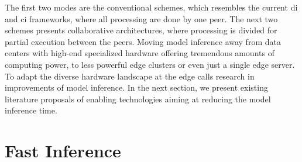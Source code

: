 The first two modes are the conventional schemes, which resembles the current \gls{di} and \gls{ci} frameworks, where all processing are done by one peer. The next two schemes presents collaborative architectures, where processing is divided for partial execution between the peers.
Moving model inference away from data centers with high-end specialized hardware offering tremendous amounts of computing power, to less powerful edge clusters or even just a single edge server. To adapt the diverse hardware landscape at the edge calls research in improvements of model inference. In the next section, we present existing literature proposals of enabling technologies aiming at reducing the model inference time.

\section{Fast Inference} \label{sec:ei-fast-inference}

